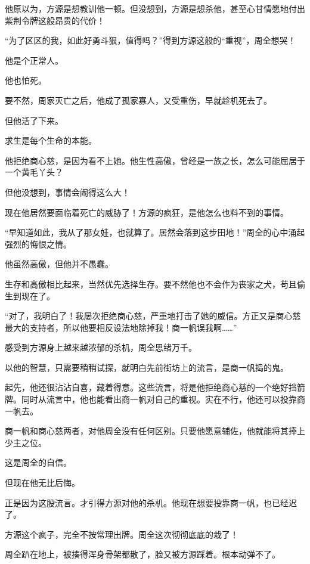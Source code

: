 
\begin{this_body}

他原以为，方源是想教训他一顿。但没想到，方源是想杀他，甚至心甘情愿地付出紫荆令牌这般昂贵的代价！

“为了区区的我，如此好勇斗狠，值得吗？”得到方源这般的“重视”，周全想哭！

他是个正常人。

他也怕死。

要不然，周家灭亡之后，他成了孤家寡人，又受重伤，早就趁机死去了。

但他活了下来。

求生是每个生命的本能。

他拒绝商心慈，是因为看不上她。他生性高傲，曾经是一族之长，怎么可能屈居于一个黄毛丫头？

但他没想到，事情会闹得这么大！

现在他居然要面临着死亡的威胁了！方源的疯狂，是他怎么也料不到的事情。

“早知道如此，我从了那女娃，也就算了。居然会落到这步田地！”周全的心中涌起强烈的悔恨之情。

他虽然高傲，但他并不愚蠢。

生存和高傲相比起来，当然优先选择生存。要不然他也不会作为丧家之犬，苟且偷生到现在了。

“对了，我明白了！我屡次拒绝商心慈，严重地打击了她的威信。方正又是商心慈最大的支持者，所以他要相反设法地除掉我！商一帆误我啊……”

感受到方源身上越来越浓郁的杀机，周全思绪万千。

以他的智慧，只需要稍稍试探，就明白先前街坊上的流言，是商一帆捣的鬼。

起先，他还很沾沾自喜，藏着得意。这些流言，将是他拒绝商心慈的一个绝好挡箭牌。同时从流言中，他也能看出商一帆对自己的重视。实在不行，他还可以投靠商一帆去。

商一帆和商心慈两者，对他周全没有任何区别。只要他愿意辅佐，他就能将其捧上少主之位。

这是周全的自信。

但现在他无比后悔。

正是因为这股流言。才引得方源对他的杀机。他现在想要投靠商一帆，也已经迟了。

方源这个疯子，完全不按常理出牌。周全这次彻彻底底的栽了！

周全趴在地上，被揍得浑身骨架都散了，脸又被方源踩着。根本动弹不了。


\end{this_body}
